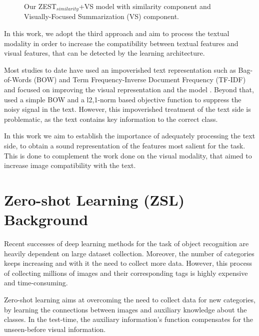 \documentclass[11pt,a4paper]{article}
\begin{document}
\begin{figure}[t]
\centering
{}
 \caption{Our ZEST$_{similarity}$+VS model with similarity component and Visually-Focused Summarization (VS) component.}
\label{fig:data}
\end{figure}

In this work, we adopt the third approach and aim to process the textual modality in order to increase the compatibility between textual features and visual features, that can be detected by the learning architecture.
\par

Most studies to date have used an impoverished text representation such as Bag-of-Words (BOW) and Term Frequency-Inverse Document Frequency (TF-IDF) and focused on improving the visual representation and the model \cite{lei2015predicting,elhoseiny2013write,elhoseiny2016write,elhoseiny2017link,zhu2018generative}. Beyond that, \citet{qiao2016less} used a simple BOW and a l2,1-norm based objective function to suppress the noisy signal in the text. However, this impoverished treatment of the text side is problematic, as the text contains key information to the correct class. 

In this work we aim to establish the importance of adequately processing the text side, to obtain a sound representation of the features most salient for the task. This is done to complement the work done on the visual modality, that aimed to increase image compatibility with the text.

\section{Zero-shot Learning (ZSL) Background}

Recent successes of deep learning methods for the task of object recognition are heavily dependent on large dataset collection.
Moreover, the number of categories keeps increasing and with it the need to collect more data. However, this process of collecting millions of images and their corresponding tags is highly expensive and time-consuming. \par

Zero-shot learning aims at overcoming the need to collect data for new categories, by learning the connections between images and auxiliary knowledge about the classes. In the test-time, the auxiliary information's function compensates for the unseen-before visual information.
\par
\end{document}
